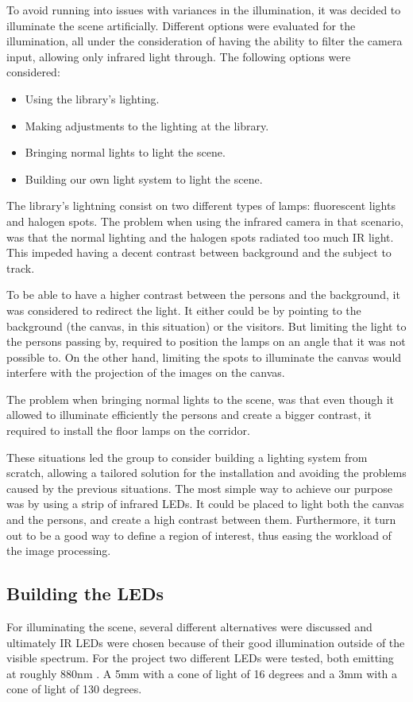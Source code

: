 To avoid running into issues with variances in the illumination, it was decided to illuminate the scene artificially. Different options were evaluated for the illumination, all under the consideration of having the ability to filter the camera input, allowing only infrared light through. The following options were considered:

\begin{itemize}
\item Using the library's lighting.
\item Making adjustments to the lighting at the library.
\item Bringing normal lights to light the scene.
\item Building our own light system to light the scene.
\end{itemize}

The library's lightning consist on two different types of lamps: fluorescent lights and halogen spots. The problem when using the infrared camera in that scenario, was that the normal lighting and the halogen spots radiated too much IR light. This impeded having a decent contrast between background and the subject to track.

To be able to have a higher contrast between the persons and the background, it was considered to redirect the light. It either could be by pointing to the background (the canvas, in this situation) or the visitors. But limiting the light to the persons passing by, required to position the lamps on an angle that it was not possible to. On the other hand, limiting the spots to illuminate the canvas would interfere with the projection of the images on the canvas.

The problem when bringing normal lights to the scene, was that even though it allowed to illuminate efficiently the persons and create a bigger contrast, it required to install the floor lamps on the corridor.

These situations led the group to consider building a lighting system from scratch, allowing a tailored solution for the installation and avoiding the problems caused by the previous situations. The most simple way to achieve our purpose was by using a strip of infrared LEDs. It could be placed to light both the canvas and the persons, and create a high contrast between them. Furthermore, it turn out to be a good way to define a region of interest, thus easing the workload of the image processing.

\subsection{Building the LEDs}
For illuminating the scene, several different alternatives were discussed and ultimately IR LEDs were chosen  because of their good illumination outside of the visible spectrum. For the project two different LEDs were tested, both emitting at roughly 880nm \citep{5mm_led} \citep{3mm_led}. A 5mm with a cone of light of 16 degrees and a 3mm with a cone of light of 130 degrees.

